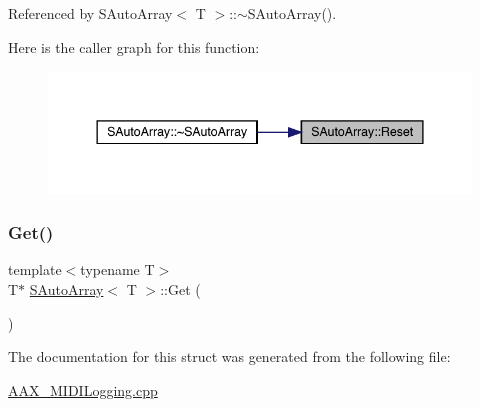 Referenced by S\+Auto\+Array$<$ T $>$\+::$\sim$\+S\+Auto\+Array().

Here is the caller graph for this function\+:
\nopagebreak
\begin{figure}[H]
\begin{center}
\leavevmode
\includegraphics[width=344pt]{a01949_a03fecb1c751d3f68d8f44f34126e363c_icgraph}
\end{center}
\end{figure}
\mbox{\label{a01949_a3d01a99320c3f2b0e542bd6113f19f29}} 
\subsubsection{\texorpdfstring{Get()}{Get()}}
{\footnotesize\ttfamily template$<$typename T$>$ \\
T$\ast$ \mbox{\hyperlink{a01949}{S\+Auto\+Array}}$<$ T $>$\+::Get (\begin{DoxyParamCaption}{ }\end{DoxyParamCaption})\hspace{0.3cm}{\ttfamily [inline]}}



The documentation for this struct was generated from the following file\+:\begin{DoxyCompactItemize}
\item 
\mbox{\hyperlink{a00734}{A\+A\+X\+\_\+\+M\+I\+D\+I\+Logging.\+cpp}}\end{DoxyCompactItemize}
